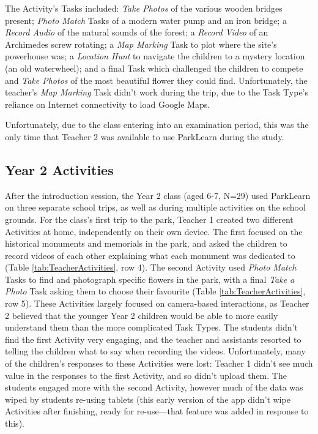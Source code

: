 The Activity's Tasks included: \textit{Take Photos} of the various wooden bridges present; \textit{Photo Match} Tasks of a modern water pump and an iron bridge; a \textit{Record Audio} of the natural sounds of the forest; a \textit{Record Video} of an Archimedes screw rotating; a \textit{Map Marking} Task to plot where the site's powerhouse was; a \textit{Location Hunt} to navigate the children to a mystery location (an old waterwheel); and a final Task which challenged the children to compete and \textit{Take Photos} of the most beautiful flower they could find. Unfortunately, the teacher's \textit{Map Marking} Task didn't work during the trip, due to the Task Type's reliance on Internet connectivity to load Google Maps.

Unfortunately, due to the class entering into an examination period, this was the only time that Teacher 2 was available to use ParkLearn during the study.

\subsection{Year 2 Activities}

After the introduction session, the Year 2 class (aged 6-7, N=29) used ParkLearn on three separate school trips, as well as during multiple activities on the school grounds. For the class's first trip to the park, Teacher 1 created two different Activities at home, independently on their own device. The first focused on the historical monuments and memorials in the park, and asked the children to record videos of each other explaining what each monument was dedicated to (Table \ref{tab:TeacherActivities}, row 4). The second Activity used \textit{Photo Match} Tasks to find and photograph specific flowers in the park, with a final \textit{Take a Photo} Task asking them to choose their favourite (Table \ref{tab:TeacherActivities}, row 5). These Activities largely focused on camera-based interactions, as Teacher 2 believed that the younger Year 2 children would be able to more easily understand them than the more complicated Task Types. The students didn't find the first Activity very engaging, and the teacher and assistants resorted to telling the children what to say when recording the videos. Unfortunately, many of the children's responses to these Activities were lost: Teacher 1 didn't see much value in the responses to the first Activity, and so didn't upload them. The students engaged more with the second Activity, however much of the data was wiped by students re-using tablets (this early version of the app didn't wipe Activities after finishing, ready for re-use---that feature was added in response to this).   

